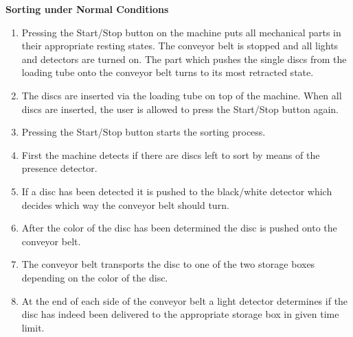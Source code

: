 \documentclass[a4paper,oneside,11pt]{report}
\begin{document}
\textbf{Sorting under Normal Conditions}
\begin{enumerate}
\item Pressing the Start/Stop button on the machine puts all mechanical parts in their appropriate resting states. The conveyor belt is stopped and all lights and detectors are turned on. The part which pushes the single discs from the loading tube onto the conveyor belt turns to its most retracted state.
\item The discs are inserted via the loading tube on top of the machine. When all discs are inserted, the user is allowed to press the Start/Stop button again.
\item Pressing the Start/Stop button starts the sorting process.
\item First the machine detects if there are discs left to sort by means of the presence detector.
\item If a disc has been detected it is pushed to the black/white detector which decides which way the conveyor belt should turn.
\item After the color of the disc has been determined the disc is pushed onto the conveyor belt.
\item The conveyor belt transports the disc to one of the two storage boxes depending on the color of the disc.
\item At the end of each side of the conveyor belt a light detector determines if the disc has indeed been delivered to the appropriate storage box in given time limit.
\end{enumerate}
\end{document}
